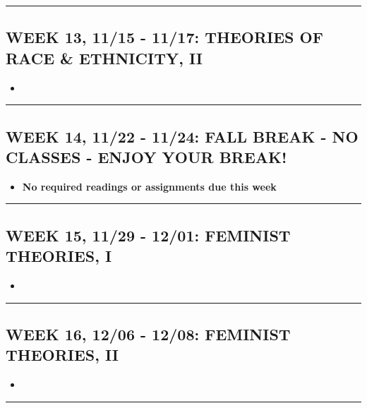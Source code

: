 \documentclass[11pt,]{article}
\providecommand{\tightlist}{%
  \setlength{\itemsep}{0pt}\setlength{\parskip}{0pt}}
\begin{document}
\bigbreak
\hrule

\hypertarget{week-13-1115---1117-theories-of-race-ethnicity-ii}{%
\subsection{WEEK 13, 11/15 - 11/17: THEORIES OF RACE \& ETHNICITY,
II}\label{week-13-1115---1117-theories-of-race-ethnicity-ii}}

\begin{itemize}
\tightlist
\item
\end{itemize}

\bigbreak
\hrule

\hypertarget{week-14-1122---1124-fall-break---no-classes---enjoy-your-break}{%
\subsection{WEEK 14, 11/22 - 11/24: FALL BREAK - NO CLASSES - ENJOY YOUR
BREAK!}\label{week-14-1122---1124-fall-break---no-classes---enjoy-your-break}}

\begin{itemize}
\tightlist
\item
  \textbf{No required readings or assignments due this week}
\end{itemize}

\bigbreak
\hrule

\hypertarget{week-15-1129---1201-feminist-theories-i}{%
\subsection{WEEK 15, 11/29 - 12/01: FEMINIST THEORIES,
I}\label{week-15-1129---1201-feminist-theories-i}}

\begin{itemize}
\tightlist
\item
\end{itemize}

\bigbreak
\hrule

\hypertarget{week-16-1206---1208-feminist-theories-ii}{%
\subsection{WEEK 16, 12/06 - 12/08: FEMINIST THEORIES,
II}\label{week-16-1206---1208-feminist-theories-ii}}

\begin{itemize}
\tightlist
\item
\end{itemize}

\bigbreak
\hrule
\end{document}
